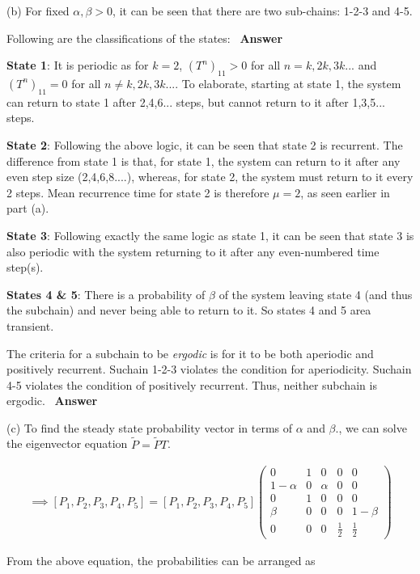 (b) For fixed $\alpha , \beta > 0$, it can be seen that there are two sub-chains: 1-2-3 and 4-5.

Following are the classifications of the states: \ \textbf{Answer}

\textbf{State 1}: It is periodic as for $k = 2$, $(T^n)_{11} > 0$ for all $n = k,2k,3k...$ and $(T^n)_{11} = 0$ for all $n \neq k,2k,3k...$. To elaborate, starting at state 1, the system can return to state 1 after 2,4,6... steps, but cannot return to it after 1,3,5... steps.

\textbf{State 2}: Following the above logic, it can be seen that state 2 is recurrent. The difference from state 1 is that, for state 1, the system can return to it after any even step size (2,4,6,8....), whereas, for state 2, the system must return to it every 2 steps. Mean recurrence time for state 2 is therefore $\mu=2$, as seen earlier in part (a).

\textbf{State 3}: Following exactly the same logic as state 1, it can be seen that state 3 is also periodic with the system returning to it after any even-numbered time step(s).

\textbf{States 4 \& 5}: There is a probability of $\beta$ of the system leaving state 4 (and thus the subchain) and never being able to return to it. So states  4 and 5 area transient.

The criteria for a subchain to be \textit{ergodic} is for it to be both aperiodic and positively recurrent. Suchain 1-2-3 violates the condition for aperiodicity. Suchain 4-5 violates the condition of positively recurrent. Thus, neither subchain is ergodic. \ \textbf{Answer}

(c) To find the steady state probability vector in terms of $\alpha$ and $\beta$., we can solve the eigenvector equation $\tilde{P} = \tilde{P}T$.

\begin{gather*}
\implies [P_1 , P_2 , P_3 , P_4 , P_5] = [P_1 , P_2 , P_3 , P_4 , P_5] \begin{pmatrix}
  0 & 1 & 0 & 0 & 0 \\
  1-\alpha & 0 & \alpha & 0 & 0 \\
  0 & 1 & 0 & 0 & 0 \\
  \beta & 0 & 0 & 0 & 1-\beta \\
  0 & 0 & 0 & \frac{1}{2} & \frac{1}{2}
\end{pmatrix}
\end{gather*}

From the above equation, the probabilities can be arranged as

